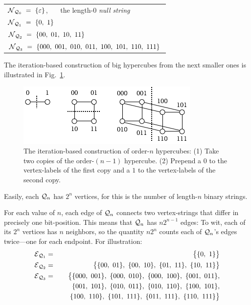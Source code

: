 \begin{itemize}
\smallskip

\hspace*{.25in}\begin{tabular}{l}
$\n_{{\fq}_0}
  \ = \ 
\{ \varepsilon \}$, \ \ \ the length-$0$ {\em null string} \\ 
$\mbox{$\cal N$}_{{\mbox{{\scriptsize $\cal Q$}}}_1}
  \ = \ \{ 0, \ 1 \}$ \\
$\mbox{$\cal N$}_{{\mbox{{\scriptsize $\cal Q$}}}_2}
  \ = \ \{ 00, \ 01, \ 10, \ 11 \}$ \\
$\mbox{$\cal N$}_{{\mbox{{\scriptsize $\cal Q$}}}_3}
  \ = \ \{ 000, \ 001, \ 010, \ 011, \ 100, \ 101, \ 110, \ 111 \}$
\end{tabular}

\smallskip

The iteration-based construction of big hypercubes from the next smaller ones is illustrated in Fig.~\ref{fig:hypercube}.
\begin{figure}[hbt]
\begin{center}
       \includegraphics[scale=0.6]{FiguresGraph/hypercube}
\caption{The iteration-based construction of order-$n$ hypercubes:  (1) Take two copies of the order-$(n-1)$ hypercube.  (2) Prepend a $0$ to the vertex-labels of the first copy and a $1$ to the vertex-labels of the second copy.}
  \label{fig:hypercube}
\end{center}
\end{figure}

\smallskip

Easily, each $\mbox{$\cal Q$}_n$ has $2^n$ vertices, for this is the number of length-$n$ binary strings.

\medskip

For each value of $n$, each edge of $\mbox{$\cal Q$}_n$ connects two vertex-strings that differ in precisely one bit-position.  This means that $\mbox{$\cal Q$}_n$ has $n 2^{n-1}$ edges: To wit, each of its $2^n$ vertices has $n$ neighbors, so the quantity $n 2^n$ counts each of $\mbox{$\cal Q$}_n$'s edges twice---one for each endpoint.  For illustration:
\begin{eqnarray*}
\mbox{$\cal E$}_{{\mbox{{\scriptsize $\cal Q$}}}_1}
  & = &
\big\{ \{ 0, \ 1 \} \big\} \\
\mbox{$\cal E$}_{{\mbox{{\scriptsize $\cal Q$}}}_2}
  & = & \big\{
\{ 00, \ 01 \}, \ \{ 00, \ 10\}, \
\{ 01, \ 11 \}, \ \{ 10, \ 11\} 
\big\} \\
\mbox{$\cal E$}_{{\mbox{{\scriptsize $\cal Q$}}}_3}
  & = & \big\{ 
\{000, \ 001\}, \
\{000, \ 010\}, \
\{000, \ 100\}, \
\{001, \ 011\}, \\
  &  & \hspace*{.2in}
\{001, \ 101\}, \
\{010, \ 011\}, \
\{010, \ 110\}, \
\{100, \ 101\}, \\
  &  & \hspace*{.2in}
\{100, \ 110\}, \
\{101, \ 111\}, \
\{011, \ 111\}, \
\{110, \ 111\}
\big\}
\end{eqnarray*}
\end{itemize}

